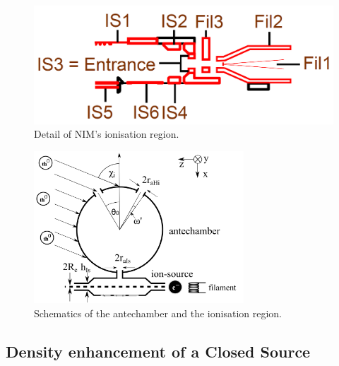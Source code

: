 	\begin{figure}[h]
		\centering
		\includegraphics[width= .5\textwidth]{Bilder/NIM_schema_zoom_IS.png}
		\caption{Detail of NIM's ionisation region.}
		\label{fig:ISZoom}
	\end{figure}
	\begin{figure}[h]
		\centering
		\includegraphics[width= 0.7\textwidth]{Bilder/particleDensEnh.png}
		\caption{Schematics of the antechamber and the ionisation region.}
		\label{fig:thAntIs}
	\end{figure}

	\subsection{Density enhancement of a Closed Source}\label{subsubsec:Densenhan}
	
